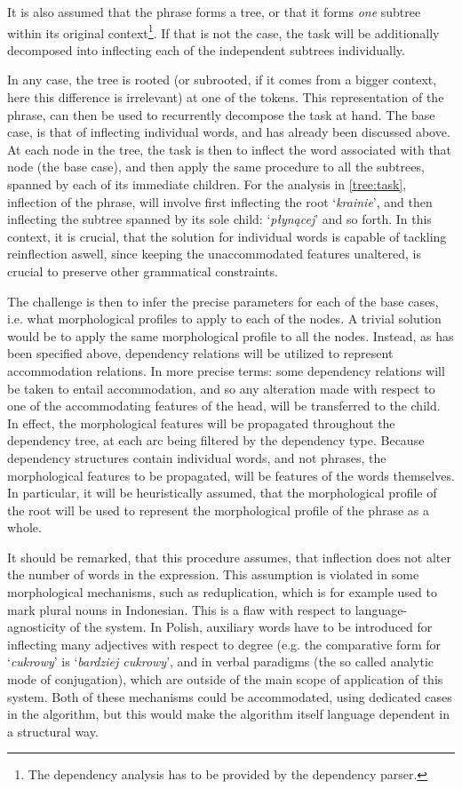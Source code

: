 \documentclass[12pt]{article}
\newcommand{\inlinegloss}[1]{`\textit{#1}'}
\begin{document}
\noindent It is also assumed that the phrase forms a tree, or that it forms \textit{one} subtree within its original context\footnote{The dependency analysis has to be provided by the dependency parser.}. If that is not the case, the task will be additionally decomposed into inflecting each of the independent subtrees individually. 

In any case, the tree is rooted (or subrooted, if it comes from a bigger context, here this difference is irrelevant) at one of the tokens. This representation of the phrase, can then be used to recurrently decompose the task at hand. The base case, is that of inflecting individual words, and has already been discussed above. At each node in the tree, the task is then to inflect the word associated with that node (the base case), and then apply the same procedure to all the subtrees, spanned by each of its immediate children. For the analysis in \autoref{tree:task}, inflection of the phrase, will involve first inflecting the root \inlinegloss{krainie}, and then inflecting the subtree spanned by its sole child: \inlinegloss{płynącej} and so forth. In this context, it is crucial, that the solution for individual words is capable of tackling reinflection aswell, since keeping the unaccommodated features unaltered, is crucial to preserve other grammatical constraints.

The challenge is then to infer the precise parameters for each of the base cases, i.e. what morphological profiles to apply to each of the nodes. A trivial solution would be to apply the same morphological profile to all the nodes. Instead, as has been specified above, dependency relations will be utilized to represent accommodation relations. In more precise terms: some dependency relations will be taken to entail accommodation, and so any alteration made with respect to one of the accommodating features of the head, will be transferred to the child. In effect, the morphological features will be propagated throughout the dependency tree, at each arc being filtered by the dependency type. Because dependency structures contain individual words, and not phrases, the morphological features to be propagated, will be features of the words themselves. In particular, it will be heuristically assumed, that the morphological profile of the root will be used to represent the morphological profile of the phrase as a whole.

It should be remarked, that this procedure assumes, that inflection does not alter the number of words in the expression. This assumption is violated in some morphological mechanisms, such as reduplication, which is for example used to mark plural nouns in Indonesian. This is a flaw with respect to language-agnosticity of the system. In Polish, auxiliary words have to be introduced for inflecting many adjectives with respect to degree (e.g. the comparative form for \inlinegloss{cukrowy} is \inlinegloss{bardziej cukrowy}, and in verbal paradigms (the so called analytic mode of conjugation), which are outside of the main scope of application of this system. Both of these mechanisms could be accommodated, using dedicated cases in the algorithm, but this would make the algorithm itself language dependent in a structural way.
\end{document}
